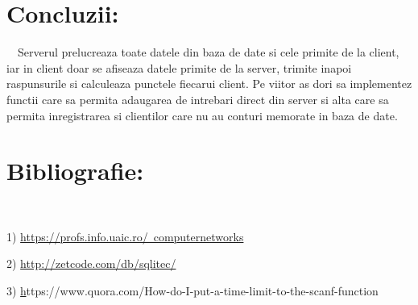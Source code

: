\documentclass{article}
\begin{document}
\vspace{0.3cm}

\section*{Concluzii:}

$\quad$Serverul prelucreaza toate datele din baza de date si cele primite de la client, iar in client doar se afiseaza datele primite de la server, trimite inapoi raspunsurile si calculeaza punctele fiecarui client. Pe viitor as dori sa implementez functii care sa permita adaugarea de intrebari direct din server si alta care sa permita inregistrarea si clientilor care nu au conturi memorate in baza de date.

\section*{Bibliografie:}
$\quad$

1) \href{https://profs.info.uaic.ro/~computernetworks}{https://profs.info.uaic.ro/~computernetworks}

2) \href{http://zetcode.com/db/sqlitec/}{http://zetcode.com/db/sqlitec/}

3) \href{https://www.quora.com/How-do-I-put-a-time-limit-to-the-scanf-function}https://www.quora.com/How-do-I-put-a-time-limit-to-the-scanf-function{}
\end{document}
